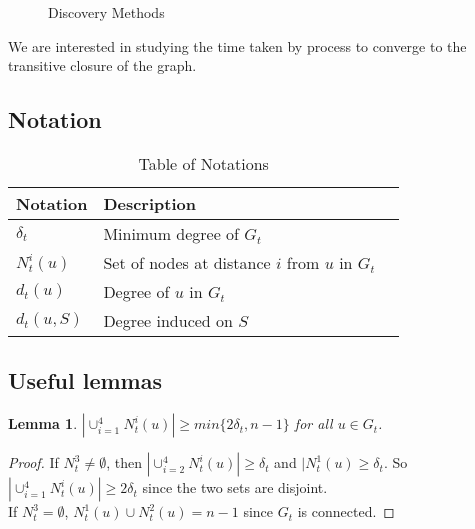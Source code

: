 \documentclass[
10pt, %
a4paper, %
oneside, %
headinclude,footinclude, %
BCOR5mm, %
]{scrartcl}
\newtheorem{lemma}[theorem]{\textbf{Lemma}}
\begin{document}
\begin{figure}[tb]
	\centering
	 \quad
	\caption[Discovery Methods]{Discovery Methods} %
	\label{fig:esempio}
\end{figure}
We are interested in studying the time taken by process to converge to the transitive closure of the graph.
\subsection{Notation}

\begin{table}[hbt]
	\caption{Table of Notations}
	\centering
	\begin{tabular}{llr}
		\cmidrule(r){1-2}
		Notation & Description \\
		\midrule
		$\delta_t$ & Minimum degree of $G_t$  \\
		$N_t^i(u)$ & Set of nodes at distance $i$ from $u$ in $G_t$ \\
		$d_t(u)$ & Degree of $u$ in $G_t$ \\
		$d_t(u, S)$ & Degree induced on $S$ \\
		\bottomrule
	\end{tabular}
	\label{tab:label}
\end{table}

\subsection{Useful lemmas}

\begin{lemma}\label{lem:1}
	$|\cup_{i=1}^{4} N_t^i(u)| \geq min \{ 2\delta_t, n-1\}$ for all $u \in G_t$.
\end{lemma}
\begin{proof}
	If $N_t^3 \ne \emptyset$, then $|\cup_{i=2}^{4} N_t^i(u)| \geq \delta_t$ and $|N_t^1(u) \geq \delta_t$. So $|\cup_{i=1}^{4} N_t^i(u)| \geq 2\delta_t$ since the two sets are disjoint. \\
	If $N_t^3 = \emptyset$, $N_t^1(u) \cup N_t^2(u) = n-1$ since $G_t$ is connected.
\end{proof}
\end{document}
